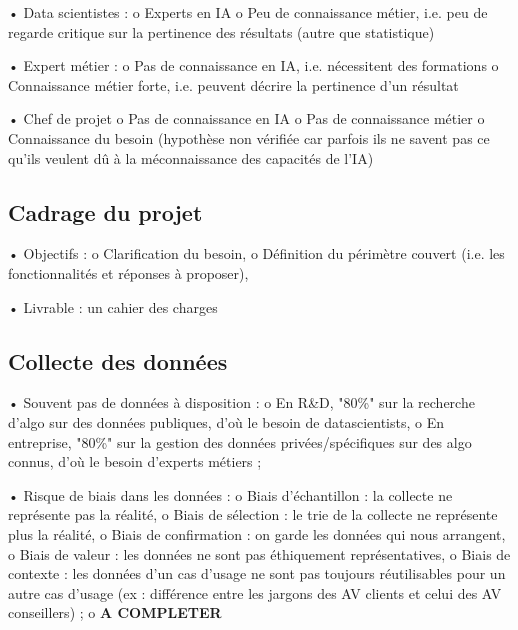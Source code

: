             •	Data scientistes :
                o	Experts en IA
                o	Peu de connaissance métier, i.e. peu de regarde critique sur la pertinence des résultats (autre que statistique)
            
            •	Expert métier :
                o	Pas de connaissance en IA, i.e. nécessitent des formations
                o	Connaissance métier forte, i.e. peuvent décrire la pertinence d’un résultat
            
            •	Chef de projet
                o	Pas de connaissance en IA
                o	Pas de connaissance métier
                o	Connaissance du besoin (hypothèse non vérifiée car parfois ils ne savent pas ce qu’ils veulent dû à la méconnaissance des capacités de l’IA)

        \subsection{Cadrage du projet}

            •	Objectifs :
                o	Clarification du besoin,
                o	Définition du périmètre couvert (i.e. les fonctionnalités et réponses à proposer),

            •   Livrable : un cahier des charges

        \subsection{Collecte des données}

            •	Souvent pas de données à disposition :
                o	En R\&D, "80\%" sur la recherche d’algo sur des données publiques, d'où le besoin de datascientists,
                o	En entreprise, "80\%" sur la gestion des données privées/spécifiques sur des algo connus, d'où le besoin d'experts métiers ;
    
            •	Risque de biais dans les données :
                o	Biais d’échantillon : la collecte ne représente pas la réalité,
                o	Biais de sélection : le trie de la collecte ne représente plus la réalité,
                o	Biais de confirmation : on garde les données qui nous arrangent,
                o	Biais de valeur : les données ne sont pas éthiquement représentatives,
                o	Biais de contexte : les données d’un cas d’usage ne sont pas toujours réutilisables pour un autre cas d’usage (ex : différence entre les jargons des AV clients et celui des AV conseillers) ;
                o	\textbf{A COMPLETER}
            
